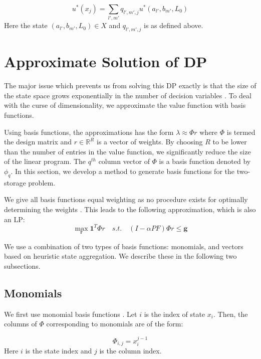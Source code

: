 \documentclass[conference]{IEEEtran}
\begin{document}
\begin{equation}
    u^{*}(x_{j})=\sum_{l',m'}q_{l',m',j}u^{*}(a_{l'},b_{m'},L_{0})
\end{equation} Here the state $(a_{l'},b_{m'},L_{0})\in X$ and $q_{l',m',j}$ is as defined above.


\section{Approximate Solution of DP}
The major issue which prevents us from solving this DP exactly is that the size of the state space grows exponentially in the number of decision variables \cite{deFarias:2003:LPA:970869.970918}. To deal with the curse of dimensionality, we approximate the value function with basis functions.

Using basis functions, the approximations has the form $\lambda\approx \Phi r$ where $\Phi$ is termed the design matrix and $r\in \mathbb{R}^R$ is a vector of weights. By choosing $R$ to be lower than the number of entries in the value function, we significantly reduce the size of the linear program. The $q^{th}$ column vector of $\Phi$ is a basis function denoted by $\phi_{q}$. In this section, we develop a method to generate basis functions for the two-storage problem.

We give all basis functions equal weighting as no procedure exists for optimally determining the weights \cite{deFarias:2003:LPA:970869.970918, PatrascuReluEugen2004}. This leads to the following approximation, which is also an LP:
\begin{equation} \label{eq:ApproxLP}
    \max_{\boldsymbol{r}} \boldsymbol{1}^{T} \Phi r
    \hspace{1em}s.t.\hspace{1em}
    (I-\alpha PF)\Phi r \leq \boldsymbol{g}
\end{equation}

We use a combination of two types of basis functions: monomials, and vectors based on heuristic state aggregation. We describe these in the following two subsections.

\subsection{Monomials}
    We first use monomial basis functions \cite{bertsekas1995dynamic,478953}. Let $i$ is the index of state $x_{i}$. Then, the columns of $\Phi$ corresponding to monomials are of the form:
	
	\begin{displaymath}
        \Phi_{i,j}=x_{i}^{j-1}
    \end{displaymath} Here $i$ is the state index and $j$ is the column index. %
\end{document}
